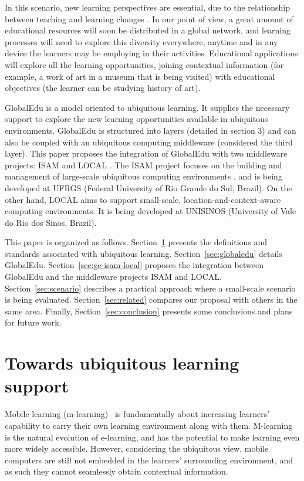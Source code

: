\documentclass[5p,authoryear]{elsarticle}
\begin{document}
In this scenario, new learning perspectives are essential, due to the
relationship between teaching and learning changes \citep{rogers05}. In our
point of view, a great amount of educational resources will soon be distributed
in a global network, and learning processes will need to explore this diversity
everywhere, anytime and in any device the learners may be employing in their
activities.  Educational applications will explore all the learning
opportunities, joining contextual information (for example, a work of art in a
museum that is being visited) with educational objectives (the learner can be
studying history of art). 

GlobalEdu is a model oriented to ubiquitous learning. It supplies the necessary
support to explore the new learning opportunities available in ubiquitous
environments. GlobalEdu is structured into layers (detailed in section 3) and
can also be coupled with an ubiquitous computing middleware (considered the
third layer). This paper proposes the integration of GlobalEdu with two
middleware projects: ISAM \citep{yamin02,augustin04} and LOCAL
\citep{barbosa07,barbosa08}. The ISAM project focuses on the building and
management of large-scale ubiquitous computing environments \citep{augustin05},
and is being developed at UFRGS (Federal University of Rio Grande do Sul,
Brazil). On the other hand, LOCAL aims to support small-scale,
location-and-context-aware computing environments. It is being developed at
UNISINOS (University of Vale do Rio dos Sinos, Brazil).

This paper is organized as follows. Section~\ref{sec:ubisupport} presents the
definitions and standards associated with ubiquitous learning.
Section~\ref{sec:globaledu} details GlobalEdu.  Section~\ref{sec:ge-isam-local}
proposes the integration between GlobalEdu and the middleware projects ISAM and
LOCAL. Section~\ref{sec:scenario} describes a practical approach where a
small-scale scenario is being evaluated. Section~\ref{sec:related} compares our
proposal with others in the same area. Finally, Section~\ref{sec:conclusion}
presents some conclusions and plans for future work.

%
%
\section{Towards ubiquitous learning support} \label{sec:ubisupport}

Mobile learning (m-learning) \citep{tatar03} is fundamentally about increasing
learners' capability to carry their own learning environment along with them.
M-learning is the natural evolution of e-learning, and has the potential to
make learning even more widely accessible. However, considering the ubiquitous
view, mobile computers are still not embedded in the learners' surrounding
environment, and as such they cannot seamlessly obtain contextual information. 
\end{document}
